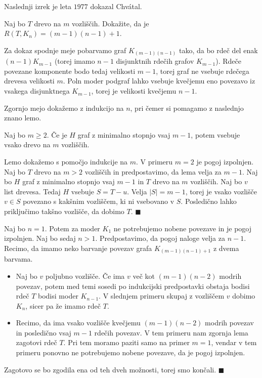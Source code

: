 \documentclass[twoside,11pt]{article}
\providecommand{\abs}[1]{\left\lvert #1\right\rvert}
\begin{document}
Naslednji izrek je leta $1977$ dokazal Chvátal.

\begin{izrek}[Chvátal]
    Naj bo $T$ drevo na $m$ vozliščih. Dokažite, da je $R(T, K_n) = (m-1)(n-1)+1$.    
\end{izrek}

\begin{dokaz}
    Za dokaz spodnje meje pobarvamo graf $K_{(m-1)(n-1)}$ tako, da bo rdeč del enak 
    $(n-1)K_{m-1}$ (torej imamo $n-1$ disjunktnih rdečih grafov $K_{m-1}$). Rdeče povezane komponente 
    bodo tedaj velikosti $m-1$, torej graf ne vsebuje rdečega drevesa velikosti $m$. Poln moder 
    podgraf lahko vsebuje kvečjemu eno povezavo iz vsakega disjunktnega $K_{m-1}$, torej je 
    velikosti kvečjemu $n-1$.

    Zgornjo mejo dokažemo z indukcijo na $n$, pri čemer si pomagamo z naslednjo znano lemo.
    \begin{lema*}
        Naj bo $m \ge 2$. Če je $H$ graf z minimalno stopnjo vsaj $m-1$, potem vsebuje vsako drevo na $m$ vozliščih.
    \end{lema*}
    \begin{dokaz}
        Lemo dokažemo s pomočjo indukcije na $m$. V primeru $m=2$ je pogoj izpolnjen. Naj bo 
        $T$ drevo na $m > 2$ vozliščih in predpostavimo, da lema velja za $m-1$. Naj bo $H$ 
        graf z minimalno stopnjo vsaj $m-1$ in $T$ drevo na $m$ vozliščih. Naj bo $v$ list drevesa. 
        Tedaj $H$ vsebuje $S = T - u$. Velja $\abs{S} = {m-1}$, torej je vsako vozlišče 
        $v \in S$ povezano s kakšnim vozliščem, ki ni vsebovano v $S$. Posledično lahko 
        priključimo takšno vozlišče, da dobimo $T$. \hfill $\blacksquare$
    \end{dokaz}
    Naj bo $n = 1$. Potem za moder $K_1$ ne potrebujemo nobene povezave in je pogoj izpolnjen. 
    Naj bo sedaj $n > 1$. Predpostavimo, da pogoj naloge velja za $n - 1$. Recimo, da imamo neko barvanje povezav grafa $K_{(m-1)(n-1)+1}$ z dvema barvama. 
    \begin{itemize}
        \item Naj bo $v$ poljubno vozlišče. Če ima $v$ več kot $(m-1)(n-2)$ modrih povezav, potem med temi sosedi 
        po indukcijski predpostavki obstaja bodisi rdeč $T$ bodisi moder $K_{n-1}$. V slednjem 
        primeru skupaj z vozliščem $v$ dobimo $K_n$, sicer pa že imamo rdeč $T$.
        \item Recimo, da ima vsako vozlišče kvečjemu $(m-1)(n-2)$ modrih povezav in posledično 
        vsaj $m-1$ rdečih povezav. V tem primeru nam zgornja lema zagotovi rdeč $T$. Pri tem 
        moramo paziti samo na primer $m = 1$, vendar v tem primeru ponovno ne potrebujemo 
        nobene povezave, da je pogoj izpolnjen.
    \end{itemize}
    Zagotovo se bo zgodila ena od teh dveh možnosti, torej smo končali.  \hfill $\blacksquare$
\end{dokaz}
\end{document}
